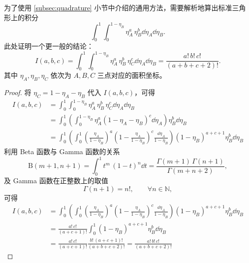 为了使用 \ref{subsec:quadrature} 小节中介绍的通用方法，需要解析地算出标准三角形上的积分
\begin{equation}
\int_{0}^{1}\int_{0}^{1-\eta_{B}}\eta_{A}^{a}\,\eta_{B}^{b}\dd{\eta_{A}}\dd{\eta_{B}}.
\end{equation}
此处证明一个更一般的结论：
\begin{equation}
I(a,b,c)=\int_{0}^{1}\int_{0}^{1-\eta_{B}}\eta_{A}^{a}\,\eta_{B}^{b}\,\eta_{C}^{c}\dd{\eta_{A}}\dd{\eta_{B}}=\frac{a!\,b!\,c!}{(a+b+c+2)!}.
\end{equation}
其中 $\eta_{A},\eta_{B},\eta_{C}$ 依次为 $A,B,C$ 三点对应的面积坐标。
\begin{proof}
将 $\eta_{C}=1-\eta_{A}-\eta_{B}$ 代入 $I(a,b,c)$，可得
\begin{equation}
\begin{aligned}I(a,b,c) & =\int_{0}^{1}\int_{0}^{1-\eta_{B}}\eta_{A}^{a}\,\eta_{B}^{b}\,\eta_{C}^{c}\dd{\eta_{A}}\dd{\eta_{B}}\\
 & =\int_{0}^{1}\left(\int_{0}^{1-\eta_{B}}\eta_{A}^{a}\left(1-\eta_{A}-\eta_{B}\right)^{c}\dd{\eta_{A}}\right)\eta_{B}^{b}\dd{\eta_{B}}\\
 & =\int_{0}^{1}\left(\int_{0}^{1}\left(\frac{\eta_{A}}{1-\eta_{B}}\right)^{a}\left(1-\frac{\eta_{A}}{1-\eta_{B}}\right)^{c}\frac{\dd{\eta_{A}}}{1-\eta_{B}}\right)\left(1-\eta_{B}\right)^{a+c+1}\eta_{B}^{b}\dd{\eta_{B}}
\end{aligned}
\end{equation}
利用 Beta 函数与 Gamma 函数的关系
\begin{equation}
\mathrm{B}(m+1,n+1)=\int_{0}^{1}t^{m}\,(1-t)^{n}\dd{t}=\frac{\Gamma(m+1)\,\Gamma(n+1)}{\Gamma(m+n+2)},
\end{equation}
及 Gamma 函数在正整数上的取值
\begin{equation}
\Gamma(n+1)=n!,\qquad\forall n\in\mathbb{N},
\end{equation}
可得
\begin{equation}
\begin{aligned}I(a,b,c) & =\int_{0}^{1}\left(\int_{0}^{1}\left(\frac{\eta_{A}}{1-\eta_{B}}\right)^{a}\left(1-\frac{\eta_{A}}{1-\eta_{B}}\right)^{c}\frac{\dd{\eta_{A}}}{1-\eta_{B}}\right)\left(1-\eta_{B}\right)^{a+c+1}\eta_{B}^{b}\dd{\eta_{B}}\\
 & =\frac{a!\,c!}{(a+c+1)!}\int_{0}^{1}\left(1-\eta_{B}\right)^{a+c+1}\eta_{B}^{b}\dd{\eta_{B}}\\
 & =\frac{a!\,c!}{(a+c+1)!}\frac{b!\,(a+c+1)!}{(a+b+c+2)!}=\frac{a!\,b!\,c!}{(a+b+c+2)!}
\end{aligned}
\end{equation}
\end{proof}
%

